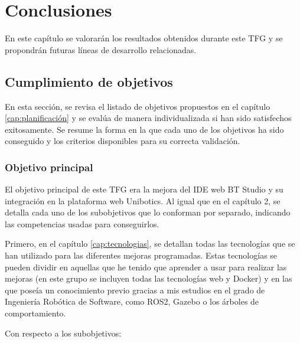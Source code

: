 \chapter{Conclusiones}\label{cap:conclusiones}

En este capítulo se valorarán los resultados obtenidos durante este TFG y se propondrán futuras líneas de desarrollo relacionadas. 

\section{Cumplimiento de objetivos}

En esta sección, se revisa el listado de objetivos propuestos en el capítulo \ref{cap:planificación} y se evalúa de manera individualizada si han sido satisfechos exitosamente. Se resume la forma en la que cada uno de los objetivos ha sido conseguido y los criterios disponibles para su correcta validación. 

\subsection{Objetivo principal}

El objetivo principal de este TFG era la mejora del IDE web BT Studio y su integración en la plataforma web Unibotics. Al igual que en el capítulo 2, se detalla cada uno de los subobjetivos que lo conforman por separado, indicando las competencias usadas para conseguirlos.

Primero, en el capítulo \ref{cap:tecnologias}, se detallan todas las tecnologías que se han utilizado para las diferentes mejoras programadas. Estas tecnologías se pueden dividir en aquellas que he tenido que aprender a usar para realizar las mejoras (en este grupo se incluyen todas las tecnologías web y Docker) y en las que poseía un conocimiento previo gracias a mis estudios en el grado de Ingeniería Robótica de Software, como ROS2, Gazebo o los árboles de comportamiento. 


Con respecto a los subobjetivos: 

